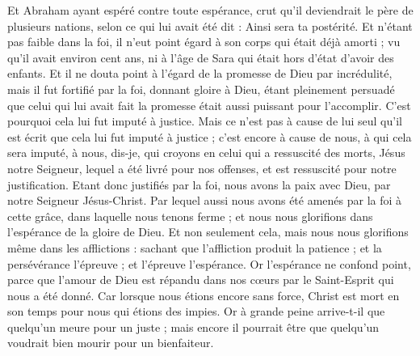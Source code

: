 \begin{multicols}{2}
Et Abraham ayant espéré contre toute espérance, crut qu'il deviendrait le père de plusieurs nations, selon ce qui lui avait été dit : Ainsi sera ta postérité.
Et n'étant pas faible dans la foi, il n'eut point égard à son corps qui était déjà amorti ; vu qu'il avait environ cent ans, ni à l'âge de Sara qui était hors d'état d'avoir des enfants.
Et il ne douta point à l'égard de la promesse de Dieu par incrédulité, mais il fut fortifié par la foi, donnant gloire à Dieu,
étant pleinement persuadé que celui qui lui avait fait la promesse était aussi puissant pour l'accomplir.
C'est pourquoi cela lui fut imputé à justice.
Mais ce n'est pas à cause de lui seul qu'il est écrit que cela lui fut imputé à justice ;
c'est encore à cause de nous, à qui cela sera imputé, à nous, dis-je, qui croyons en celui qui a ressuscité des morts, Jésus notre Seigneur,
lequel a été livré pour nos offenses, et est ressuscité pour notre justification.
\VerseOne{}Etant donc justifiés par la foi, nous avons la paix avec Dieu, par notre Seigneur Jésus-Christ.
Par lequel aussi nous avons été amenés par la foi à cette grâce, dans laquelle nous tenons ferme ; et nous nous glorifions dans l'espérance de la gloire de Dieu.
Et non seulement cela, mais nous nous glorifions même dans les afflictions : sachant que l'affliction produit la patience ;
et la persévérance l'épreuve ; et l'épreuve l'espérance.
Or l'espérance ne confond point, parce que l'amour de Dieu est répandu dans nos cœurs par le Saint-Esprit qui nous a été donné.
Car lorsque nous étions encore sans force, Christ est mort en son temps pour nous qui étions des impies.
Or à grande peine arrive-t-il que quelqu'un meure pour un juste ; mais encore il pourrait être que quelqu'un voudrait bien mourir pour un bienfaiteur.

\end{multicols}
